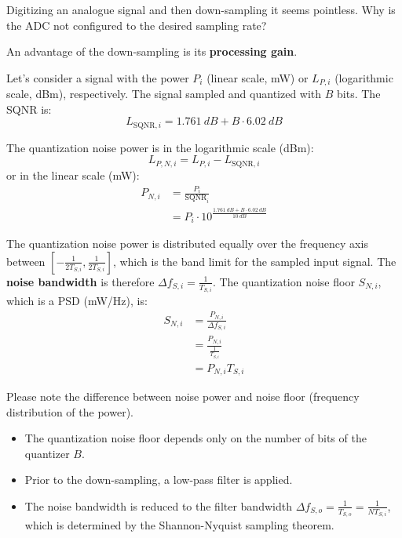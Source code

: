 \begin{refsection}
Digitizing an analogue signal and then down-sampling it seems pointless. Why is the \ac{ADC} not configured to the desired sampling rate?

An advantage of the down-sampling is its  \textbf{processing gain}.

Let's consider a signal with the power $P_i$ (linear scale, \si{mW}) or $L_{P,i}$ (logarithmic scale, \si{dBm}), respectively. The signal sampled and quantized with $B$ bits. The \ac{SQNR} is:
\begin{equation}
	L_{\mathrm{SQNR},i} = \SI{1.761}{dB} + B \cdot \SI{6.02}{dB}
\end{equation}

The quantization noise power is in the logarithmic scale (\si{dBm}):
\begin{equation}
	L_{P,N,i} = L_{P,i} - L_{\mathrm{SQNR},i}
\end{equation}
or in the linear scale (\si{mW}):
\begin{equation}
	\begin{split}
		P_{N,i} &= \frac{P_i}{\mathrm{SQNR}_i} \\
		 &= P_i \cdot 10^{\frac{\SI{1.761}{dB} + B \cdot \SI{6.02}{dB}}{\SI{10}{dB}}}
	\end{split}
\end{equation}

The quantization noise power is distributed equally over the frequency axis between $[-\frac{1}{2 T_{S,i}}, \frac{1}{2 T_{S,i}}]$, which is the band limit for the sampled input signal. The  \textbf{noise bandwidth} is therefore $\Delta f_{S,i} = \frac{1}{T_{S,i}}$. The quantization noise floor $S_{N,i}$, which is a \ac{PSD} (\si{mW/Hz}), is:
\begin{equation}
	\begin{split}
		S_{N,i} &= \frac{P_{N,i}}{\Delta f_{S,i}} \\
		 &= \frac{P_{N,i}}{\frac{1}{T_{S,i}}} \\
		 &= P_{N,i} T_{S,i}
	\end{split}
\end{equation}

\begin{attention}
	Please note the difference between noise power and noise floor (frequency distribution of the power).
\end{attention}

\begin{itemize}
	\item The quantization noise floor depends only on the number of bits of the quantizer $B$.
	\item Prior to the down-sampling, a low-pass filter is applied.
	\item The noise bandwidth is reduced to the filter bandwidth $\Delta f_{S,o} = \frac{1}{T_{S,o}} = \frac{1}{N T_{S,i}}$, which is determined by the Shannon-Nyquist sampling theorem.
\end{itemize}


\end{refsection}
